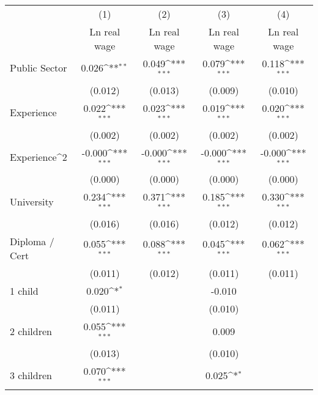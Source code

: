 {
\def\sym#1{\ifmmode^{#1}\else\(^{#1}\)\fi}
\begin{tabular}{l*{4}{c}}
\hline\hline
                    &\multicolumn{1}{c}{(1)}&\multicolumn{1}{c}{(2)}&\multicolumn{1}{c}{(3)}&\multicolumn{1}{c}{(4)}\\
                    &\multicolumn{1}{c}{Ln real wage}&\multicolumn{1}{c}{Ln real wage}&\multicolumn{1}{c}{Ln real wage}&\multicolumn{1}{c}{Ln real wage}\\
\hline
Public Sector       &       0.026\sym{**} &       0.049\sym{***}&       0.079\sym{***}&       0.118\sym{***}\\
                    &     (0.012)         &     (0.013)         &     (0.009)         &     (0.010)         \\
Experience          &       0.022\sym{***}&       0.023\sym{***}&       0.019\sym{***}&       0.020\sym{***}\\
                    &     (0.002)         &     (0.002)         &     (0.002)         &     (0.002)         \\
Experience^{2}      &      -0.000\sym{***}&      -0.000\sym{***}&      -0.000\sym{***}&      -0.000\sym{***}\\
                    &     (0.000)         &     (0.000)         &     (0.000)         &     (0.000)         \\
University          &       0.234\sym{***}&       0.371\sym{***}&       0.185\sym{***}&       0.330\sym{***}\\
                    &     (0.016)         &     (0.016)         &     (0.012)         &     (0.012)         \\
Diploma / Cert      &       0.055\sym{***}&       0.088\sym{***}&       0.045\sym{***}&       0.062\sym{***}\\
                    &     (0.011)         &     (0.012)         &     (0.011)         &     (0.011)         \\
1 child             &       0.020\sym{*}  &                     &      -0.010         &                     \\
                    &     (0.011)         &                     &     (0.010)         &                     \\
2 children          &       0.055\sym{***}&                     &       0.009         &                     \\
                    &     (0.013)         &                     &     (0.010)         &                     \\
3 children          &       0.070\sym{***}&                     &       0.025\sym{*}  &                     \\

\end{tabular}}

